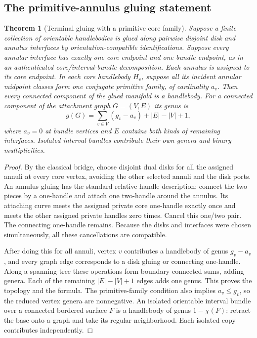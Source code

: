 \documentclass[11pt,a4paper]{article}
\newtheorem{theorem}{Theorem}[section]
\theoremstyle{definition}
\theoremstyle{remark}
\begin{document}
\subsection{The primitive-annulus gluing statement}

\begin{theorem}[Terminal gluing with a primitive core family]
\label{thm:gluing}
Suppose a finite collection of orientable handlebodies is glued along
pairwise disjoint disk and annulus interfaces by orientation-compatible
identifications. Suppose every annular interface has exactly one core
endpoint and one bundle endpoint, as in an authenticated
core/interval-bundle decomposition. Each annulus is assigned to its core
endpoint. In each core handlebody $H_v$, suppose all its incident annular
midpoint classes form one conjugate primitive family, of cardinality $a_v$.
Then every connected component of the glued manifold is a handlebody.
For a connected component of the attachment graph $G=(V,E)$ its genus is
\begin{equation}
 g(G)=\sum_{v\in V}(g_v-a_v)+|E|-|V|+1,
 \label{eq:genus}
\end{equation}
where $a_v=0$ at bundle vertices and $E$ contains both kinds of remaining
interfaces. Isolated interval bundles contribute their own genera and
binary multiplicities.
\end{theorem}

\begin{proof}
By the classical bridge, choose disjoint dual disks for all the assigned
annuli at every core vertex, avoiding the other selected annuli and the disk
ports. An annulus gluing has the standard relative handle description:
connect the two pieces by a one-handle and attach one two-handle around the
annulus. Its attaching curve meets the assigned private core one-handle
exactly once and meets the other assigned private handles zero times. Cancel
this one/two pair. The connecting one-handle remains. Because the disks and
interfaces were chosen simultaneously, all these cancellations are compatible.

After doing this for all annuli, vertex $v$ contributes a handlebody of genus
$g_v-a_v$, and every graph edge corresponds to a disk gluing or connecting
one-handle. Along a spanning tree these operations form boundary connected
sums, adding genera. Each of the remaining $|E|-|V|+1$ edges adds one genus.
This proves the topology and the formula. The primitive-family condition
also implies $a_v\le g_v$, so the reduced vertex genera are nonnegative.
An isolated orientable interval bundle over a connected bordered surface
$F$ is a handlebody of genus $1-\chi(F)$: retract the base onto a graph and
take its regular neighborhood. Each isolated copy contributes independently.
\end{proof}
\end{document}
